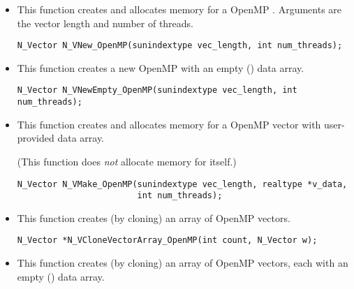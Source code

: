 \begin{itemize}


\item {}

  This function creates and allocates memory for a OpenMP .
  Arguments are the vector length and number of threads.

  \verb|N_Vector N_VNew_OpenMP(sunindextype vec_length, int num_threads);|


\item {}

  This function creates a new OpenMP  with an empty () data array.

  

  \verb|N_Vector N_VNewEmpty_OpenMP(sunindextype vec_length, int num_threads);|


\item {}

 This function creates and allocates memory for a OpenMP vector
 with user-provided data array.

 (This function does {\em not} allocate memory for  itself.)

\begin{verbatim}
N_Vector N_VMake_OpenMP(sunindextype vec_length, realtype *v_data,
                        int num_threads);
\end{verbatim}


\item {}

 This function creates (by cloning) an array of  OpenMP vectors.

 

 \verb|N_Vector *N_VCloneVectorArray_OpenMP(int count, N_Vector w);|


\item {}

 This function creates (by cloning) an array of  OpenMP vectors, each with an
 empty () data array.


\end{itemize}
